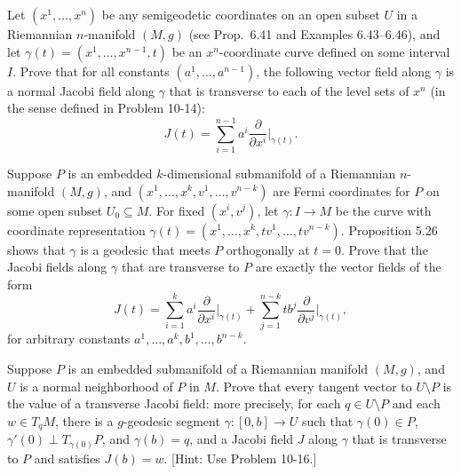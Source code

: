 \begin{exercise}
\label{prob:jacobi-semigeodetic-transverse}

Let $(x^1,\ldots,x^n)$ be any semigeodetic coordinates on an open subset $U$ in a Riemannian $n$-manifold $(M,g)$ (see Prop.\ 6.41 and Examples 6.43--6.46), and let $\gamma(t) = (x^1,\ldots,x^{n-1},t)$ be an $x^n$-coordinate curve defined on some interval $I$. Prove that for all constants $(a^1,\ldots,a^{n-1})$, the following vector field along $\gamma$ is a normal Jacobi field along $\gamma$ that is transverse to each of the level sets of $x^n$ (in the sense defined in Problem 10-14):
\[
J(t) = \sum_{i=1}^{n-1} a^i \frac{\partial}{\partial x^i}\bigg|_{\gamma(t)}.
\]
\end{exercise}

\begin{exercise}
\label{prob:jacobi-fermi-transverse}

Suppose $P$ is an embedded $k$-dimensional submanifold of a Riemannian $n$-manifold $(M,g)$, and $(x^1,\ldots,x^k,v^1,\ldots,v^{n-k})$ are Fermi coordinates for $P$ on some open subset $U_0 \subseteq M$. For fixed $(x^i,v^j)$, let $\gamma: I \to M$ be the curve with coordinate representation $\gamma(t) = (x^1,\ldots,x^k,tv^1,\ldots,tv^{n-k})$. Proposition 5.26 shows that $\gamma$ is a geodesic that meets $P$ orthogonally at $t=0$. Prove that the Jacobi fields along $\gamma$ that are transverse to $P$ are exactly the vector fields of the form
\[
J(t) = \sum_{i=1}^{k} a^i \frac{\partial}{\partial x^i}\bigg|_{\gamma(t)} + \sum_{j=1}^{n-k} t b^j \frac{\partial}{\partial v^j}\bigg|_{\gamma(t)},
\]
for arbitrary constants $a^1,\ldots,a^k,b^1,\ldots,b^{n-k}$.
\end{exercise}

\begin{exercise}
\label{prob:tangent-vector-jacobi-normal-neighborhood}

Suppose $P$ is an embedded submanifold of a Riemannian manifold $(M,g)$, and $U$ is a normal neighborhood of $P$ in $M$. Prove that every tangent vector to $U \setminus P$ is the value of a transverse Jacobi field: more precisely, for each $q \in U \setminus P$ and each $w \in T_q M$, there is a $g$-geodesic segment $\gamma: [0,b] \to U$ such that $\gamma(0) \in P$, $\gamma'(0) \perp T_{\gamma(0)} P$, and $\gamma(b) = q$, and a Jacobi field $J$ along $\gamma$ that is transverse to $P$ and satisfies $J(b) = w$. [Hint: Use Problem 10-16.]
\end{exercise}

